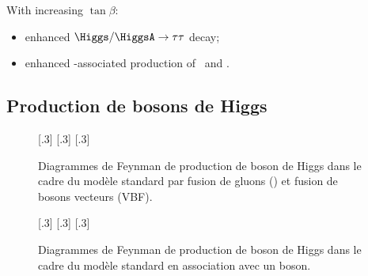 With increasing $\tan\beta$:
\begin{itemize}
\item enhanced $\Higgs/\HiggsA \to \tau\tau$ decay;
\item enhanced \quarkb-associated production of \Higgs\ and \HiggsA.
\end{itemize}

\subsection{Production de bosons de Higgs}\label{chapter-MS-MSSM-section-pheno_Higgs_MSSM-subsec-production}

\begin{figure}[h]
\centering
\vspace{\baselineskip}
[.3\textwidth]
{\vspace{\baselineskip}}
\hfill
{}[.3\textwidth]
{\vspace{\baselineskip}}
\hfill
{}[.3\textwidth]
{\vspace{\baselineskip}}
\caption[Production de boson de Higgs par fusion de gluons et de bosons vecteurs.]{Diagrammes de Feynman de production de boson de Higgs dans le cadre du modèle standard par fusion de gluons (\gluon\gluon\higgs) et fusion de bosons vecteurs (VBF).}
\label{fig-fgraph-Higgs_prod_ggh_VBF}
\end{figure}

\begin{figure}[h]
\centering
\vspace{\baselineskip}
[.3\textwidth]
{\vspace{\baselineskip}}
\hfill
{}[.3\textwidth]
{\vspace{\baselineskip}}
\hfill
{}[.3\textwidth]
{\vspace{\baselineskip}}
\caption[Production de boson de Higgs en association avec un boson.]{Diagrammes de Feynman de production de boson de Higgs dans le cadre du modèle standard en association avec un boson.}
\label{fig-fgraph-Higgs_prod_VH_ggZh}
\end{figure}

